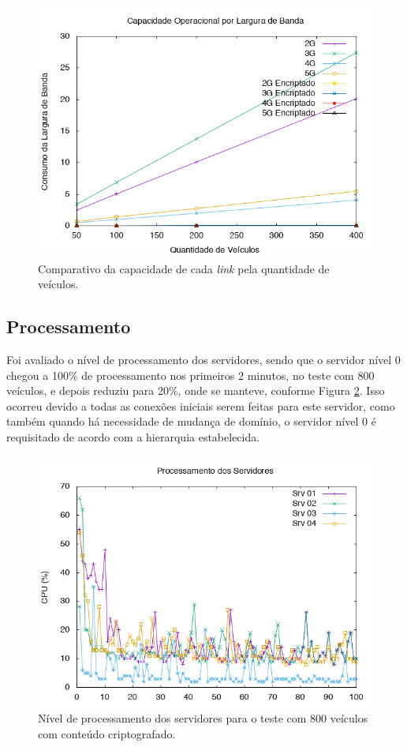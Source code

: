 \documentclass[
	12pt,				%
	oneside,			%
	a4paper,			%
	english,			%
	brazil				%
	]{abntex2ppgsi}
\begin{document}
\begin{figure}[h!]
	\centering
	\includegraphics[width=0.7\columnwidth]{images/capacidadeLink.png}
	\caption{Comparativo da capacidade de cada \textit{link} pela quantidade de veículos.}
	\label{fig:graficotaxatransferencia}
\end{figure}


\subsection{Processamento}

Foi avaliado o nível de processamento dos servidores, sendo que o servidor nível 0 chegou a 100\% de processamento nos primeiros 2 minutos, no teste com 800 veículos, e depois reduziu para 20\%, onde se manteve, conforme Figura  \ref{fig:processamento800}. Isso ocorreu devido a todas as conexões iniciais serem feitas para este servidor, como também quando há necessidade de mudança de domínio, o servidor nível 0 é requisitado de acordo com a hierarquia estabelecida. 

\begin{figure}[h!]
	\centering
	\includegraphics[width=0.7\columnwidth]{images/processamento1.png}
	\caption{Nível de processamento dos servidores para o teste com 800 veículos com conteúdo criptografado.}
	\label{fig:processamento800}
\end{figure}
\end{document}
